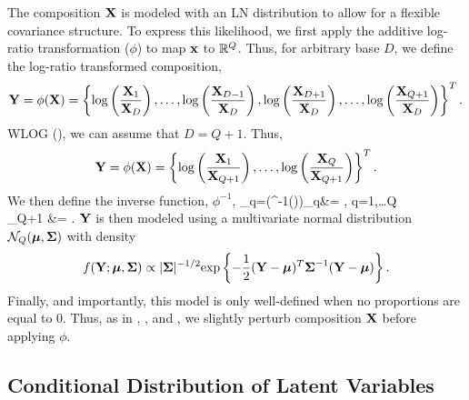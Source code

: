 \documentclass{template}
\begin{document}
The composition $\mathbf{X}$ is modeled with an LN distribution to allow for a flexible covariance structure. To express this likelihood, we first apply the additive log-ratio transformation ($\phi$) to map $\mathbf{x}$ to $\mathbb{R}^{Q}$. Thus, for arbitrary base $D$, we define the log-ratio transformed composition,
$$\mathbf{Y}=\phi(\mathbf{X})=\left\{\log\left(\dfrac{\mathbf{X}_1}{\mathbf{X}_D}\right),\ldots,\log\left(\dfrac{\mathbf{X}_{D-1}}{\mathbf{X}_D}\right),\log\left(\dfrac{\mathbf{X}_{D+1}}{\mathbf{X}_D}\right),\ldots,\log\left(\dfrac{\mathbf{X}_{Q+1}}{\mathbf{X}_D}\right)\right\}^T.$$
WLOG (\cite{aitchison1986statistical}), we can assume that $D=Q+1$. Thus,
$$\mathbf{Y}=\phi(\mathbf{X})=\left\{\log\left(\dfrac{\mathbf{X}_1}{\mathbf{X}_{Q+1}}\right),\ldots,\log\left(\dfrac{\mathbf{X}_{Q}}{\mathbf{X}_{Q+1}}\right)\right\}^T.$$
We then define the inverse function, $\phi^{-1}$,
\bal 
{}_q=(\phi^{-1}())_q&= , \quad q=1,\ldots Q\\
_{Q+1} &= .
\eal 
$\mathbf{Y}$ is then modeled using a multivariate normal distribution $\mathcal{N}_{Q}(\boldsymbol{\mu},\boldsymbol{\Sigma})$ with density
\begin{equation}\label{eq:fyeta}
f(\mathbf{Y}; \boldsymbol{\mu},\boldsymbol{\Sigma}) \propto |\boldsymbol{\Sigma}|^{-1/2} \text{exp}\left\{-\dfrac{1}{2}(\mathbf{Y}-\boldsymbol{\mu})^T\boldsymbol{\Sigma}^{-1}(\mathbf{Y}-\boldsymbol{\mu})\right\}. \end{equation}
Finally, and importantly, this model is only well-defined when no proportions are equal to $0$. Thus, as in \cite{aitchison1986statistical}, \cite{billheimer2001statistical}, and \cite{xia2013logistic}, we slightly perturb composition $\mathbf{X}$ before applying $\phi$.


\subsection{Conditional Distribution of Latent Variables}
\end{document}
